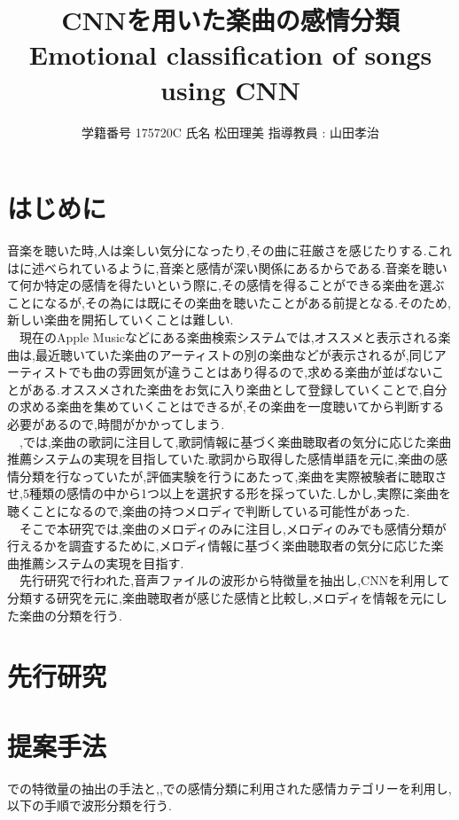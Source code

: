 \documentclass[twocolumn,twoside,9.5pt]{jarticle}
\begin{document}
\title{CNNを用いた楽曲の感情分類\\Emotional classification of songs using CNN}
\author{学籍番号 {175720C} 氏名 {松田理美} 指導教員 : 山田孝治}
\date{}
\maketitle
\thispagestyle{fancy} 

\section{はじめに}
音楽を聴いた時,人は楽しい気分になったり,その曲に荘厳さを感じたりする.これは\cite{1}に述べられているように,音楽と感情が深い関係にあるからである.音楽を聴いて何か特定の感情を得たいという際に,その感情を得ることができる楽曲を選ぶことになるが,その為には既にその楽曲を聴いたことがある前提となる.そのため,新しい楽曲を開拓していくことは難しい.\\
　現在のApple Musicなどにある楽曲検索システムでは,オススメと表示される楽曲は,最近聴いていた楽曲のアーティストの別の楽曲などが表示されるが,同じアーティストでも曲の雰囲気が違うことはあり得るので,求める楽曲が並ばないことがある.オススメされた楽曲をお気に入り楽曲として登録していくことで,自分の求める楽曲を集めていくことはできるが,その楽曲を一度聴いてから判断する必要があるので,時間がかかってしまう.\\
　\cite{2},\cite{3}では,楽曲の歌詞に注目して,歌詞情報に基づく楽曲聴取者の気分に応じた楽曲推薦システムの実現を目指していた.歌詞から取得した感情単語を元に,楽曲の感情分類を行なっていたが,評価実験を行うにあたって,楽曲を実際被験者に聴取させ,5種類の感情の中から1つ以上を選択する形を採っていた.しかし,実際に楽曲を聴くことになるので,楽曲の持つメロディで判断している可能性があった.\\
　そこで本研究では,楽曲のメロディのみに注目し,メロディのみでも感情分類が行えるかを調査するために,メロディ情報に基づく楽曲聴取者の気分に応じた楽曲推薦システムの実現を目指す.\\
　先行研究で行われた,音声ファイルの波形から特徴量を抽出し,CNNを利用して分類する研究を元に,楽曲聴取者が感じた感情と比較し,メロディを情報を元にした楽曲の分類を行う.
\section{先行研究}


\section{提案手法}
\cite{4}での特徴量の抽出の手法と,\cite{2},\cite{3}での感情分類に利用された感情カテゴリーを利用し,以下の手順で波形分類を行う.
\end{document}
